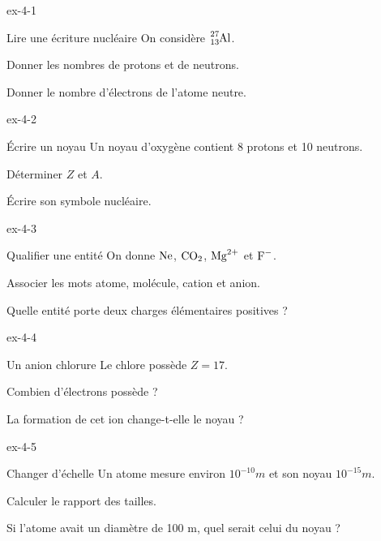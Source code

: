 \exercices
{}
\begin{blocLivre}{ex-4-1}\begin{exercice}[1]{Lire une écriture nucléaire}
On considère $\ce{^{27}_{13}Al}$.
\begin{questions}
\item Donner les nombres de protons et de neutrons.
\item Donner le nombre d’électrons de l’atome neutre.
\end{questions}
\end{exercice}\end{blocLivre}
\begin{blocLivre}{ex-4-2}\begin{exercice}[1]{Écrire un noyau}
Un noyau d’oxygène contient 8 protons et 10 neutrons.
\begin{questions}
\item Déterminer $Z$ et $A$.
\item Écrire son symbole nucléaire.
\end{questions}
\end{exercice}\end{blocLivre}
\begin{blocLivre}{ex-4-3}\begin{exercice}[1]{Qualifier une entité}
On donne $\ce{Ne}$, $\ce{CO2}$, $\ce{Mg^{2+}}$ et $\ce{F-}$.
\begin{questions}
\item Associer les mots atome, molécule, cation et anion.
\item Quelle entité porte deux charges élémentaires positives ?
\end{questions}
\end{exercice}\end{blocLivre}
\begin{blocLivre}{ex-4-4}\begin{exercice}[1]{Un anion chlorure}
Le chlore possède $Z=17$.
\begin{questions}
\item Combien d’électrons possède  ?
\item La formation de cet ion change-t-elle le noyau ?
\end{questions}
\end{exercice}\end{blocLivre}
\begin{blocLivre}{ex-4-5}\begin{exercice}[2]{Changer d’échelle}
Un atome mesure environ $10^{-10}\unit{m}$ et son noyau $10^{-15}\unit{m}$.
\begin{questions}
\item Calculer le rapport des tailles.
\item Si l’atome avait un diamètre de 100 m, quel serait celui du noyau ?
\end{questions}
\end{exercice}\end{blocLivre}
